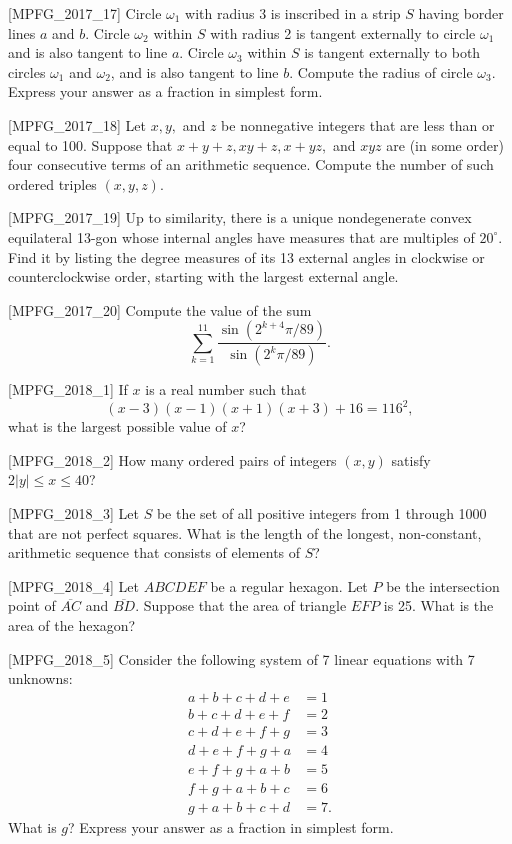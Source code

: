 [MPFG_2017_17]
Circle $\omega_1$ with radius 3 is inscribed in a strip $S$ having border lines $a$ and $b$. Circle $\omega_2$ within $S$ with radius 2 is tangent externally to circle $\omega_1$ and is also tangent to line $a$. Circle $\omega_3$ within $S$ is tangent externally to both circles $\omega_1$ and $\omega_2$, and is also tangent to line $b$. Compute the radius of circle $\omega_3$. Express your answer as a fraction in simplest form.

[MPFG_2017_18]
Let $x, y,$ and $z$ be nonnegative integers that are less than or equal to 100. Suppose that $x+y+z, xy+z, x+yz,$ and $xyz$ are (in some order) four consecutive terms of an arithmetic sequence. Compute the number of such ordered triples $(x, y, z)$.

[MPFG_2017_19]
Up to similarity, there is a unique nondegenerate convex equilateral 13-gon whose internal angles have measures that are multiples of $20^\circ$. Find it by listing the degree measures of its 13 external angles in clockwise or counterclockwise order, starting with the largest external angle.

[MPFG_2017_20]
Compute the value of the sum
$$\sum_{k=1}^{11} \frac{\sin(2^{k+4}\pi/89)}{\sin(2^k \pi/89)}.$$

[MPFG_2018_1]
If $x$ is a real number such that
$$(x-3)(x-1)(x+1)(x+3) + 16 = 116^2,$$
what is the largest possible value of $x$?

[MPFG_2018_2]
How many ordered pairs of integers $(x, y)$ satisfy $2|y| \le x \le 40$?

[MPFG_2018_3]
Let $S$ be the set of all positive integers from 1 through 1000 that are not perfect squares. What is the length of the longest, non-constant, arithmetic sequence that consists of elements of $S$?

[MPFG_2018_4]
Let $ABCDEF$ be a regular hexagon. Let $P$ be the intersection point of $\overline{AC}$ and $\overline{BD}$. Suppose that the area of triangle $EFP$ is 25. What is the area of the hexagon?

[MPFG_2018_5]
Consider the following system of 7 linear equations with 7 unknowns:
$$\begin{aligned}
a+b+c+d+e &= 1 \\
b+c+d+e+f &= 2 \\
c+d+e+f+g &= 3 \\
d+e+f+g+a &= 4 \\
e+f+g+a+b &= 5 \\
f+g+a+b+c &= 6 \\
g+a+b+c+d &= 7.
\end{aligned}$$
What is $g$? Express your answer as a fraction in simplest form.

